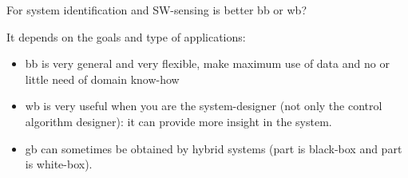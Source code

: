\begin{rem}
    For system identification and SW-sensing is better \acrlong{bb} or \acrlong{wb}?

    It depends on the goals and type of applications:

    \begin{itemize}
        \item \gls{bb} is very general and very flexible, make maximum use of data and no or little need of domain know-how 
        \item \gls{wb} is very useful when you are the system-designer (not only the control algorithm designer): it can provide more insight in the system.
        \item \gls{gb} can sometimes be obtained by hybrid systems (part is black-box and part is white-box).
    \end{itemize}
\end{rem}